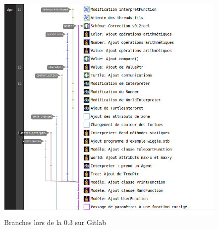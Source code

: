 \begin{figure}[h]
\centering
\includegraphics[scale=0.35]{doc/report/uml/network-v3.png}
\caption{\label{branche} Branches lors de la 0.3 sur Gitlab}
\end{figure}

